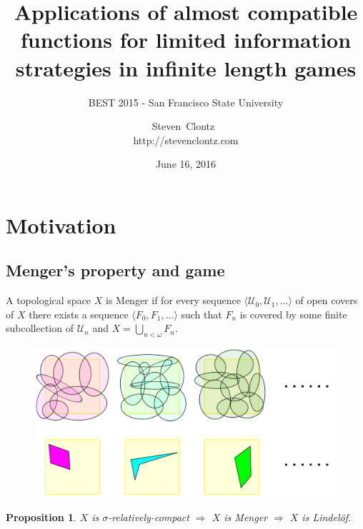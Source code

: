 \documentclass{beamer}
\title
{Applications of almost compatible functions for limited information strategies in infinite length games}
\subtitle
{BEST 2015 - San Francisco State University} %
\author%
{Steven~Clontz~\\http://stevenclontz.com}%
\institute[Auburn, AL] %
{
  Auburn, AL}
\date[15-06-16] %
{June 16, 2016}
\newtheorem{proposition}[theorem]{Proposition}
\theoremstyle{example}
\theoremstyle{definition}
\newcommand{\<}{\langle}
\renewcommand{\>}{\rangle}
\newcommand{\mc}[1]{\mathcal{#1}}
\begin{document}
\renewcommand{\pause}{}
\newcommand{\vpause}{\pause\vspace{1em}}

\begin{frame}
  \titlepage
\end{frame}

\section{Motivation}

\subsection{Menger's property and game}

\begin{frame}\small
  \begin{definition}
    A topological space \(X\) is Menger if for every sequence
    \(\<\mc U_0,\mc U_1,\dots\>\)
    of open covers of \(X\) there exists a sequence
    \(\<F_0,F_1,\dots\>\) such that
    \(F_n\) is covered by some finite subcollection of \(\mc U_n\)
    and \(X=\bigcup_{n<\omega}F_n\).
    \begin{figure}
      \includegraphics[width=0.6\linewidth]{mengerProperty.pdf}
    \end{figure}
  \end{definition}

  \pause

  \begin{proposition}
    \(X\) is \(\sigma\)-relatively-compact
      \(\Rightarrow\)
    \(X\) is Menger
      \(\Rightarrow\)
    \(X\) is Lindel\"of.
  \end{proposition}
\end{frame}
\end{document}

